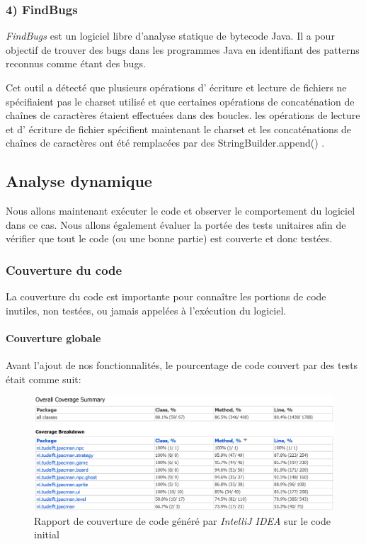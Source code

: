 \documentclass[12pt, openany]{report}
\begin{document}
\subsubsection*{4) FindBugs}

\textit{FindBugs} est un logiciel libre d'analyse statique de bytecode Java. Il a pour objectif de trouver des bugs dans les programmes Java en identifiant des patterns reconnus comme étant des bugs.

Cet outil a détecté que plusieurs opérations d' écriture et lecture de fichiers ne spécifiaient pas le \og charset \fg utilisé et que certaines opérations de concaténation de chaînes de caractères étaient effectuées dans des boucles.
les opérations de lecture et d' écriture de fichier spécifient maintenant le \og charset \fg et les concaténations de chaînes de caractères ont été remplacées par des \og StringBuilder.append() \fg.
\subsection{Analyse dynamique}

Nous allons maintenant exécuter le code et observer le comportement du logiciel dans ce cas. Nous allons également évaluer la portée des tests unitaires afin de vérifier que tout le code (ou une bonne partie) est couverte et donc testées.

\subsubsection{Couverture du code}

La couverture du code est importante pour connaître les portions de code inutiles, non testées, ou jamais appelées à l'exécution du logiciel.

\paragraph{Couverture globale}

Avant l'ajout de nos fonctionnalités, le pourcentage de code couvert par des tests était comme suit: 

\begin{figure}[!h]
	\centering
	\includegraphics[width=\textwidth]{Images/InitialCoverage}
	\caption{\label{InitialCoverage} Rapport de couverture de code généré par \textit{IntelliJ IDEA} sur le code initial}
\end{figure}
\end{document}
